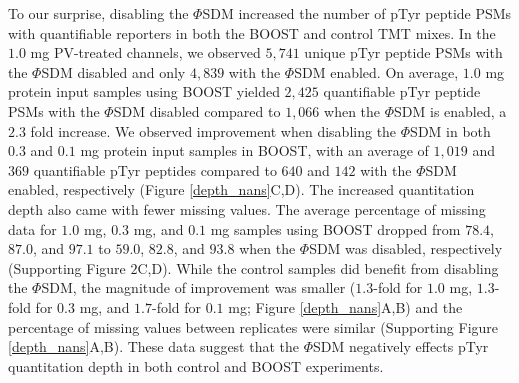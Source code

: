 \documentclass[journal=jprobs,manuscript=article]{achemso}
\begin{document}
To our surprise, disabling the $\Phi$SDM increased the number of pTyr peptide PSMs with quantifiable reporters in both the BOOST and control TMT mixes. In the $1.0$ mg PV-treated channels, we observed $5{,}741$ unique pTyr peptide PSMs with the $\Phi$SDM disabled and only $4{,}839$ with the $\Phi$SDM enabled. On average, $1.0$ mg protein input samples using BOOST yielded $2{,}425$ quantifiable pTyr peptide PSMs with the $\Phi$SDM disabled compared to $1{,}066$ when the $\Phi$SDM is enabled, a $2.3$ fold increase. We observed improvement when disabling the $\Phi$SDM in both $0.3$ and $0.1$ mg protein input samples in BOOST, with an average of $1{,}019$ and $369$ quantifiable pTyr peptides compared to $640$ and $142$ with the $\Phi$SDM enabled, respectively (Figure \ref{depth_nans}C,D). The increased quantitation depth also came with fewer missing values. The average percentage of missing data for $1.0$ mg, $0.3$ mg, and $0.1$ mg samples using BOOST dropped from $78.4$, $87.0$, and $97.1$ to $59.0$, $82.8$, and $93.8$ when the $\Phi$SDM was disabled, respectively (Supporting Figure $2$C,D).  While the control samples did benefit from disabling the $\Phi$SDM, the magnitude of improvement was smaller ($1.3$-fold for $1.0$ mg, $1.3$-fold for $0.3$ mg, and $1.7$-fold for $0.1$ mg; Figure \ref{depth_nans}A,B) and the percentage of missing values between replicates were similar (Supporting Figure \ref{depth_nans}A,B). These data suggest that the $\Phi$SDM negatively effects pTyr quantitation depth in both control and BOOST experiments.
\end{document}
